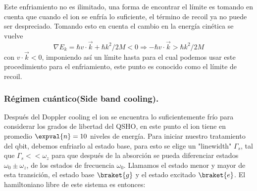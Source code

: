 Este enfriamiento no es ilimitado, una forma de encontrar el límite es tomando en cuenta que cuando el ion se enfría lo suficiente, el término de recoil ya no puede ser despreciado. Tomando esto en cuenta el cambio en la energía cinética se vuelve 
\begin{equation}
    \nabla E_{k}=\hbar v\cdot\Vec{k}+\hbar k^{2}/2M<0\Rightarrow -\hbar v\cdot\Vec{k}>\hbar k^{2}/2M
\end{equation}
con $v\cdot\Vec{k}<0$, imponiendo así un límite hasta para el cual podemos usar este procedimiento para el enfriamiento, este punto es conocido como el límite de recoil.

\subsubsection{Régimen cuántico(Side band cooling).}

Después del Doppler cooling el ion se encuentra lo suficientemente frío para considerar los grados de libertad del QSHO, en este punto el ion tiene en promedio $\expval{n}=10$ niveles de energía. Para iniciar nuestro tratamiento del qbit, debemos enfriarlo al estado base, para esto se elige un "linewidth" $\Gamma_{s}$, tal que $\Gamma_{s}<<\omega_{z}$ para que después de la absorción se pueda diferenciar estados $\omega_{0}\pm\omega_{z}$, de los estados de frecuencia $\omega_{0}$. Llamamos el estado menor y mayor de esta transición, el estado base $\braket{g}$ y el estado excitado $\braket{e}$. El hamiltoniano libre de este sistema es entonces:

